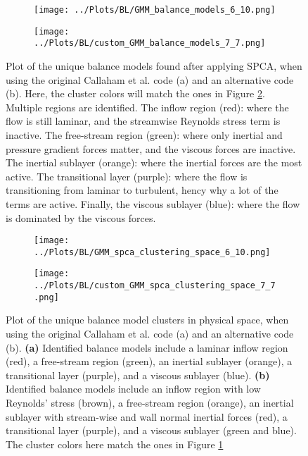 \documentclass[12pt]{report} %
\begin{document}
\begin{figure}[htbp]
  \centering
  \begin{subfigure}[b]{0.45\textwidth}
      \texttt{[image: ../Plots/BL/GMM\_balance\_models\_6\_10.png]}
      \caption{}
  \end{subfigure}
  \hfill
  \begin{subfigure}[b]{0.45\textwidth}
      \texttt{[image: ../Plots/BL/custom\_GMM\_balance\_models\_7\_7.png]}
      \caption{}
  \end{subfigure}
  \caption{Plot of the unique balance models found after applying SPCA, when using the original Callaham et al. code (a) and an alternative code (b). Here, the cluster colors will match the ones in Figure \ref{fig:balance_model_clusters}. Multiple regions are identified. The inflow region (red): where the flow is still laminar, and the streamwise Reynolds stress term is inactive. The free-stream region (green): where only inertial and pressure gradient forces matter, and the viscous forces are inactive. The inertial sublayer (orange): where the inertial forces are the most active. The transitional layer (purple): where the flow is transitioning from laminar to turbulent, hency why a lot of the terms are active. Finally, the viscous sublayer (blue): where the flow is dominated by the viscous forces.}
  \label{fig:balance_models}
\end{figure}


\begin{figure}[htbp]
  \centering
  \begin{subfigure}[b]{0.7\textwidth}
      \texttt{[image: ../Plots/BL/GMM\_spca\_clustering\_space\_6\_10.png]}
      \caption{}
  \end{subfigure}
  \begin{subfigure}[b]{0.7\textwidth}
      \texttt{[image: ../Plots/BL/custom\_GMM\_spca\_clustering\_space\_7\_7.png]}
      \caption{}
  \end{subfigure}
  \caption{Plot of the unique balance model clusters in physical space, when using the original Callaham et al. code (a) and an alternative code (b). \textbf{(a)} Identified balance models include a laminar inflow region (red), a free-stream region (green), an inertial sublayer (orange), a transitional layer (purple), and a viscous sublayer (blue). \textbf{(b)} Identified balance models include an inflow region with low Reynolds' stress (brown), a free-stream region (orange), an inertial sublayer with stream-wise and wall normal inertial forces (red), a transitional layer (purple), and a viscous sublayer (green and blue). The cluster colors here match the ones in Figure \ref{fig:balance_models}}
  \label{fig:balance_model_clusters}
\end{figure}
\end{document}
